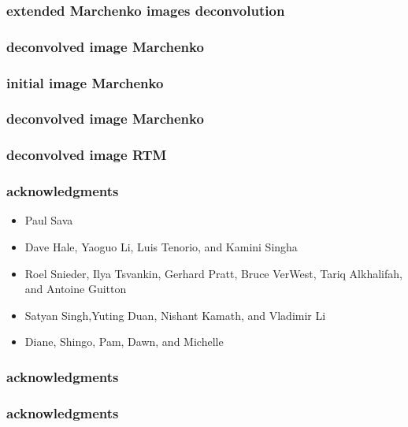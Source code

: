 \begin{frame}\frametitle{extended Marchenko images  \hfill deconvolution }
\end{frame}

\begin{frame}\frametitle{deconvolved image \hfill Marchenko }
\end{frame}
\begin{frame}\frametitle{initial image \hfill Marchenko }
\end{frame}
\begin{frame}\frametitle{deconvolved image \hfill Marchenko }
\end{frame}
\begin{frame}\frametitle{deconvolved image \hfill RTM }
\end{frame}



\begin{frame}\frametitle{acknowledgments}
\Large
\begin{itemize}

\item {Paul Sava}\\
\item {Dave Hale, Yaoguo Li, Luis Tenorio, and Kamini Singha}\\
\item { Roel Snieder, Ilya Tsvankin, Gerhard Pratt, Bruce VerWest, Tariq Alkhalifah, and Antoine Guitton}\\
\item {Satyan Singh,Yuting Duan, Nishant Kamath, and Vladimir Li} 
\item {Diane, Shingo, Pam, Dawn, and Michelle}
\end{itemize}
\end{frame}


\begin{frame}\frametitle{acknowledgments}
\end{frame}

\begin{frame}\frametitle{acknowledgments}
\end{frame}



\begin{frame}
\end{frame}





